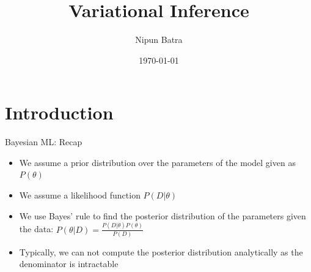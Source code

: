 \documentclass{beamer}
\begin{document}
\title{Variational Inference}
\author{Nipun Batra}
\date{\today}
\maketitle

\section{Introduction}

\begin{frame}{Bayesian ML: Recap}
    \begin{itemize}
        \item We assume a prior distribution over the parameters of the model given as $P(\theta)$
        \item We assume a likelihood function $P(D|\theta)$
        \item We use Bayes' rule to find the posterior distribution of the parameters given the data: $P(\theta|D) = \frac{P(D|\theta)P(\theta)}{P(D)}$
        \item Typically, we can not compute the posterior distribution analytically as the denominator is intractable
    \end{itemize}
    
\end{frame}
\end{document}
